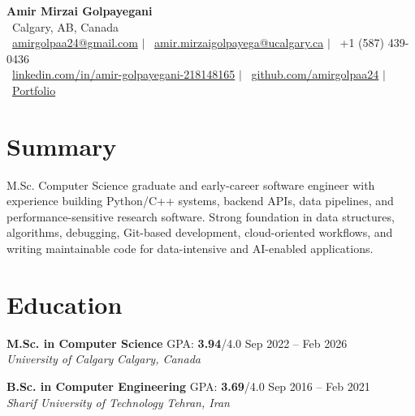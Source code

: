 \documentclass[a4paper,10pt]{article}
\newcommand{\resumeEducationSubheading}[5]{
    \textbf{#1} \hfill #2 \hfill #3 \\
    \textit{#4} \hfill \textit{#5}
}
\begin{document}

\begin{center}
    {\LARGE \textbf{Amir Mirzai Golpayegani}} \\[0.25em]
    \faMapMarker*~Calgary, AB, Canada \\[0.25em]
    \faEnvelope~\href{mailto:amirgolpaa24@gmail.com}{amirgolpaa24@gmail.com}
    $|$
    \faEnvelope~\href{mailto:amir.mirzaigolpayega@ucalgary.ca}{amir.mirzaigolpayega@ucalgary.ca}
    $|$
    \faPhone*~+1 (587) 439-0436 \\[0.25em]
    \faLinkedin~\href{https://linkedin.com/in/amir-golpayegani-218148165}{linkedin.com/in/amir-golpayegani-218148165}
    $|$
    \faGithub~\href{https://github.com/amirgolpaa24}{github.com/amirgolpaa24}
    $|$
    \faGlobe~\href{https://amir-portfolio-navy.vercel.app/}{Portfolio}
\end{center}


\section*{Summary}

M.Sc. Computer Science graduate and early-career software engineer with experience building Python/C++ systems, backend APIs, data pipelines, and performance-sensitive research software. Strong foundation in data structures, algorithms, debugging, Git-based development, cloud-oriented workflows, and writing maintainable code for data-intensive and AI-enabled applications.


\section*{Education}

\resumeEducationSubheading
{M.Sc. in Computer Science}
{GPA: \textbf{3.94}/4.0}
{Sep 2022 -- Feb 2026}
{University of Calgary}
{Calgary, Canada}

\vspace{0.35em}

\resumeEducationSubheading
{B.Sc. in Computer Engineering}
{GPA: \textbf{3.69}/4.0}
{Sep 2016 -- Feb 2021}
{Sharif University of Technology}
{Tehran, Iran}

\end{document}
